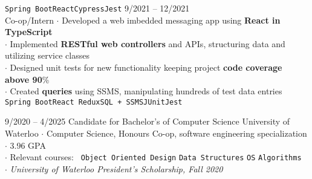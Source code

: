 \documentclass[9pt]{developercv} %
\begin{document}
\begin{minipage}[t]{\textwidth}
\begin{entrylist}
{				\texttt{Spring Boot}\slashsep\texttt{React}\slashsep\texttt{Cypress}\slashsep\texttt{Jest}
			}
		\entry
			{9/2021 -- 12/2021\\\footnotesize{Co-op/Intern}}
			{}
			{}
			{
				$\cdot$ Developed a web imbedded messaging app using \textbf{React in TypeScript}\\
				$\cdot$ Implemented \textbf{RESTful web controllers} and APIs, structuring data and utilizing service classes\\
				$\cdot$ Designed unit tests for new functionality keeping project \textbf{code coverage above 90}\%\\
				$\cdot$ Created \textbf{queries} using SSMS, manipulating hundreds of test data entries\\
				\texttt{Spring Boot}\slashsep\texttt{React Redux}\slashsep\texttt{SQL + SSMS}\slashsep\texttt{JUnit}\slashsep\texttt{Jest}
			}
	\end{entrylist}
\end{minipage}



\begin{minipage}[t]{\textwidth}
	\vspace{-\baselineskip} %

	\begin{entrylist}
		\entry
			{9/2020 -- 4/2025}
			{Candidate for Bachelor's of Computer Science}
			{University of Waterloo}
			{
				$\cdot$ Computer Science, Honours Co-op, software engineering specialization\\
				$\cdot$ 3.96 GPA\\
				$\cdot$ Relevant courses:
					\texttt{ Object Oriented Design}\slashsep
					\texttt{Data Structures}\slashsep
					\texttt{OS}\slashsep
					\texttt{Algorithms}\\
				$\cdot$ \textit{University of Waterloo President's Scholarship, Fall 2020}
			}
	\end{entrylist}
\end{minipage}

\end{document}
